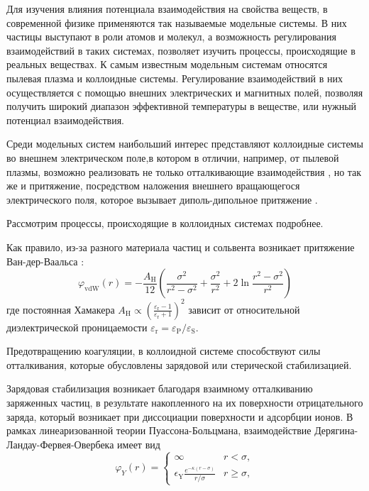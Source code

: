 Для изучения влияния потенциала взаимодействия на свойства веществ, в современной физике применяются так называемые модельные системы. В них частицы выступают в роли атомов и молекул, а возможность регулирования взаимодействий в таких системах, позволяет изучить процессы, происходящие в реальных веществах. К самым известным модельным системам относятся пылевая плазма и коллоидные системы. Регулирование взаимодействий в них осуществляется с помощью внешних электрических и магнитных полей, позволяя получить широкий диапазон эффективной температуры в веществе, или нужный потенциал взаимодействия. 

Среди модельных систем наибольший интерес представляют коллоидные системы во внешнем электрическом поле,в котором в отличии, например, от пылевой плазмы, возможно реализовать не только отталкивающие взаимодействия \cite{gel3}, но так же и притяжение, посредством наложения внешнего вращающегося электрического поля, которое вызывает диполь-дипольное притяжение \cite{gel6}.

Рассмотрим процессы, происходящие в коллоидных системах подробнее. 

Как правило, из-за разного материала частиц и сольвента возникает притяжение Ван-дер-Ваальса \cite{Yur31, Yur53}:
\begin{equation}
\varphi_{\mathrm{vdW}}(r)=-\frac{A_{\mathrm{H}}}{12}\left(\frac{\sigma^{2}}{r^{2}-\sigma^{2}}+\frac{\sigma^{2}}{r^{2}}+2 \ln \frac{r^{2}-\sigma^{2}}{r^{2}}\right)
\end{equation}
где постоянная Хамакера $A_{\mathrm{H}} \propto\left(\frac{\varepsilon_{\mathrm{r}}-1}{\varepsilon_{\mathrm{r}}+1}\right)^{2}$ зависит от относительной диэлектрической проницаемости $\varepsilon_{\mathrm{r}}=\varepsilon_{\mathrm{P}} / \varepsilon_{\mathrm{S}}$. 

Предотвращению коагуляции, в коллоидной системе способствуют силы отталкивания, которые обусловлены зарядовой или стерической стабилизацией.

Зарядовая стабилизация возникает благодаря взаимному отталкиванию заряженных частиц, в результате накопленного на их поверхности отрицательного заряда, который возникает при диссоциации поверхности и адсорбции ионов. 
В рамках линеаризованной теории Пуассона-Больцмана, взаимодействие Дерягина-Ландау-Фервея-Овербека имеет вид \cite{Yur54}
\begin{equation}
\varphi_{Y}(r)=\left\{\begin{array}{ll}
\infty & r<\sigma, \\
\epsilon_{\mathrm{Y}} \frac{e^{-\kappa(r-\sigma)}}{r / \sigma} & r \geq \sigma,
\end{array}\right.
\end{equation}

